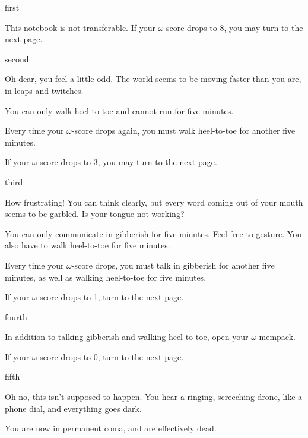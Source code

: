 \documentclass[greennotebook]{guildcamp1} %
\begin{document}
\startnotebook{\nVirus{}}



\begin{page}{first}

This notebook is not transferable. If your $\omega$-score drops to 8, you may turn to the next page.

\end{page}

\begin{page}{second}

Oh dear, you feel a little odd. The world seems to be moving faster than you are, in leaps and twitches.

You can only walk heel-to-toe and cannot run for five minutes.

Every time your $\omega$-score drops again, you must walk heel-to-toe for another five minutes.

If your $\omega$-score drops to 3, you may turn to the next page.

\end{page}


\begin{page}{third}

How frustrating! You can think clearly, but every word coming out of your mouth seems to be garbled. Is your tongue not working?

You can only communicate in gibberish for five minutes. Feel free to gesture. You also have to walk heel-to-toe for five minutes.

Every time your $\omega$-score drops, you must talk in gibberish for another five minutes, as well as walking heel-to-toe for five minutes.

If your $\omega$-score drops to 1, turn to the next page.

\end{page}



\begin{page}{fourth}

In addition to talking gibberish and walking heel-to-toe, open your $\omega$ mempack.

If your $\omega$-score drops to 0,  turn to the next page.

\end{page}



\begin{page}{fifth}

Oh no, this isn't supposed to happen. You hear a ringing, screeching drone, like a phone dial, and everything goes dark.

You are now in permanent coma, and are effectively dead.

\end{page}



\endnotebook
\end{document}
